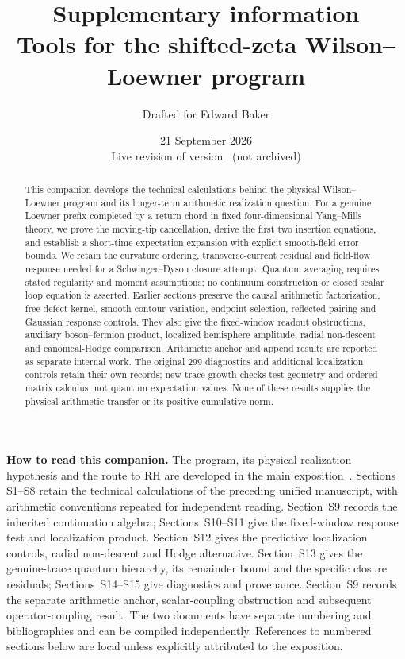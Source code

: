 \documentclass[11pt]{article}
\title{Supplementary information\\[3pt]
\large Tools for the shifted-zeta Wilson--Loewner program}
\author{Drafted for Edward Baker}
\date{21 September 2026 \\[2pt] Live revision of version \draftversion\ (not archived)}
\begin{document}
\maketitle
\begin{abstract}
This companion develops the technical calculations behind the physical
Wilson--Loewner program and its longer-term arithmetic realization question.
For a genuine Loewner prefix completed by a return chord in fixed
four-dimensional Yang--Mills theory, we prove the moving-tip cancellation,
derive the first two insertion equations, and establish a short-time
expectation expansion with explicit smooth-field error bounds. We retain
the curvature ordering, transverse-current residual and field-flow response
needed for a Schwinger--Dyson closure attempt. Quantum averaging requires
stated regularity and moment assumptions; no continuum construction or
closed scalar loop equation is asserted. Earlier sections preserve the
causal arithmetic factorization, free defect kernel, smooth contour
variation, endpoint selection, reflected pairing and Gaussian response
controls. They also give the fixed-window readout obstructions, auxiliary
boson--fermion product, localized hemisphere amplitude, radial non-descent
and canonical-Hodge comparison. Arithmetic anchor and append results are
reported as separate internal work. The original 299 diagnostics and
additional localization controls retain their own records; new trace-growth
checks test geometry and ordered matrix calculus, not quantum expectation
values. None of these results supplies the physical arithmetic transfer or
its positive cumulative norm.
\end{abstract}
\noindent\textbf{How to read this companion.}
The program, its physical realization hypothesis and the route to RH
are developed in the main exposition~\cite{Exposition}. Sections
S1--S8 retain the technical calculations of the preceding unified
manuscript, with arithmetic conventions repeated for independent
reading. Section~S9 records the inherited continuation algebra;
Sections~S10--S11 give the fixed-window response test and localization
product. Section~S12 gives the predictive localization controls, radial
non-descent and Hodge alternative. Section~S13 gives the genuine-trace
quantum hierarchy, its remainder bound and the specific closure residuals;
Sections~S14--S15 give diagnostics and provenance. Section~S9 records the
separate arithmetic anchor, scalar-coupling obstruction and subsequent
operator-coupling result.
The two documents have separate
numbering and bibliographies and can be compiled independently.
References to numbered sections below are local unless explicitly
attributed to the exposition.
\tableofcontents
















\end{document}
